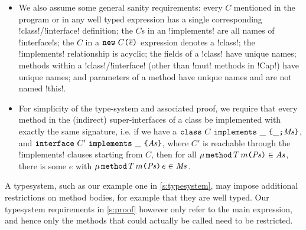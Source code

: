 \begin{itemize}

	\item We also assume some general sanity requirements:
	every $C$ mentioned in the program or in any well typed expression has a single corresponding \Q!class!/\Q!interface! definition; the $C$s in an \Q!implements! are all names of \Q!interface!s; the $C$ in a $\texttt{new}\ C\texttt{(}\hspace{0.03ex} \overline{\hspace{-0.03ex}\mathit{e}\hspace{-0.03ex}} \hspace{0.03ex}\texttt{)}$ expression denotes a \Q!class!; the \Q!implements! relationship is acyclic; the fields of a \Q!class! have unique names; 
	methods within a \Q!class!/\Q!interface! (other than \Q!mut! methods in \Q!Cap!) have unique names; and parameters of a method have unique names and are not named \Q!this!.

	\item For simplicity of the type-system and associated proof, we require that every method in the (indirect) super-interfaces of a class be implemented with exactly the same signature, i.e. if we have a $\texttt{class}\ C\ \texttt{implements}\ \_\ \texttt{\{}\_\texttt{;}\mathit{Ms}\texttt{\}}$, and $\texttt{interface}\ C'\ \texttt{implements}\ \_\ \texttt{\{}\mathit{As}\texttt{\}}$, where $C'$ is reachable through the \Q!implements! clauses starting from $C$,
	then for all $\mu\,\texttt{method}\,T\,m\texttt{(}\mathit{Ps}\texttt{)} \in \mathit{As}$, there is some $e$ with $\mu\,\texttt{method}\,T\,m\texttt{(}\mathit{Ps}\texttt{)}\,e \in \mathit{Ms}$.
\end{itemize}

A typesystem, such as our example one in \ref{s:typesystem}, may impose additional restrictions on method bodies, for example that they are well typed.
Our typesystem requirements in \ref{s:proof} however only refer to the main expression, and hence only the methods that could actually be called need to be restricted.

